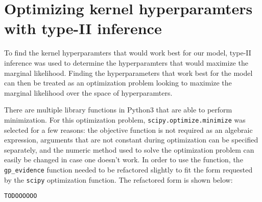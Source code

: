 \documentclass{article}
\begin{document}
\section{Optimizing kernel hyperparamters with type-II inference}
To find the kernel hyperparamters that would work best for our model, type-II inference was used to determine the hyperparamters that would maximize the marginal likelihood. Finding the hyperparameters that work best for the model can then be treated as an optimization problem looking to maximize the marginal likelihood over the space of hyperparamters.

There are multiple library functions in Python3 that are able to perform minimization. For this optimization problem, \verb+scipy.optimize.minimize+ was selected for a few reasons: the objective function is not required as an algebraic expression, arguments that are not constant during optimization can be specified separately, and the numeric method used to solve the optimization problem can easily be changed in case one doesn't work. In order to use the function, the \verb+gp_evidence+ function needed to be refactored slightly to fit the form requested by the \verb+scipy+ optimization function. The refactored form is shown below:

\begin{verbatim}
TODOOOOOO
\end{verbatim}
\end{document}
